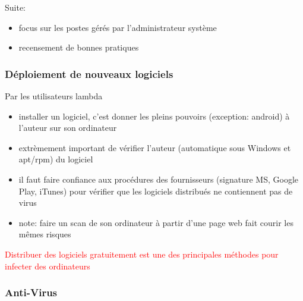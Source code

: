 \begin{reveals}
\begin{frame}
  \vfill

\begin{block}{Suite:}
  \begin{itemize}
  \item focus sur les postes gérés par l'administrateur système
  \item recensement de bonnes pratiques
  \end{itemize}
  \end{block}

  \vfill

\end{frame}

\begin{frame}
  \frametitle{Déploiement de nouveaux logiciels}

  \vfill

   \begin{block}{Par les utilisateurs lambda}
     \begin{itemize}
     \item installer un logiciel, c'est donner les pleins pouvoirs
       (exception: android) à l'auteur sur son ordinateur
     \item extrèmement important de vérifier l'auteur (automatique
       sous Windows et apt/rpm) du logiciel
     \item il faut faire confiance aux procédures des fournisseurs
       (signature MS, Google Play, iTunes) pour vérifier que les
       logiciels distribués ne contiennent pas de virus
     \item note: faire un scan de son ordinateur à partir d'une page
       web fait courir les mêmes risques
     \end{itemize}
  \end{block}

  \vfill

  \begin{center}
    \textcolor{red}{Distribuer des logiciels gratuitement est une des
      principales méthodes pour infecter des ordinateurs}
  \end{center}

\end{frame}


\begin{frame}
  \frametitle{Anti-Virus}

  \vfill


\end{frame}
\end{reveals}
